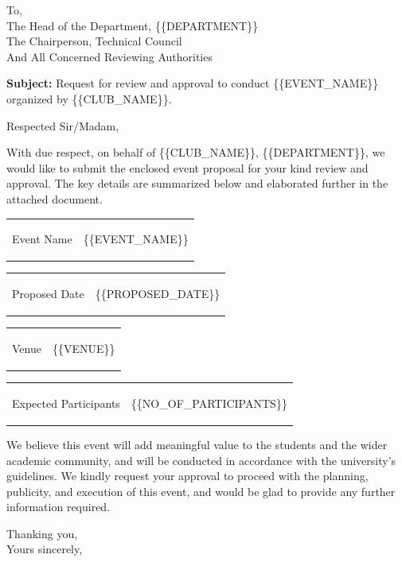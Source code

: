 \documentclass[12pt,a4paper]{article}
\newcommand{\PH}[1]{{\ttfamily\small\{\{#1\}\}}}
\newcommand{\ClubName}{\PH{CLUB\_NAME}}
\newcommand{\DepartmentName}{\PH{DEPARTMENT}}
\newcommand{\PreparedDate}{\PH{DATE}}
\newcommand{\EventName}{\PH{EVENT\_NAME}}
\newcommand{\ProposedDate}{\PH{PROPOSED\_DATE}}
\newcommand{\Venue}{\PH{VENUE}}
\newcommand{\ExpectedParticipants}{\PH{NO\_OF\_PARTICIPANTS}}
\newcommand{\SectionBox}[1]{%
\begin{tcolorbox}[colback=JainFill,colframe=JainBlue,boxrule=0.8pt,arc=1mm,left=6pt,right=6pt,top=5pt,bottom=5pt]
#1
\end{tcolorbox}
}
\newcommand{\InfoRow}[2]{%
\begin{tabularx}{\textwidth}{>{\bfseries\raggedright\arraybackslash}p{0.30\textwidth}X}
#1 & #2
\end{tabularx}\par
}
\begin{document}
\newpage


\vspace*{0.2cm}
\noindent \PreparedDate \hfill

\vspace{0.3cm}

\noindent
To,\\[3pt]
The Head of the Department, \DepartmentName\\
The Chairperson, Technical Council\\
And All Concerned Reviewing Authorities

\vspace{0.3cm}

\noindent \textbf{Subject: } Request for review and approval to conduct \EventName{} organized by \ClubName.

\vspace{0.3cm}

\noindent Respected Sir/Madam,

\vspace{0.25cm}

\noindent
With due respect, on behalf of \ClubName, \DepartmentName, we would like to submit the enclosed event proposal for your kind review and approval. The key details are summarized below and elaborated further in the attached document.

\vspace{0.3cm}

\SectionBox{
\InfoRow{Event Name}{\EventName}
\InfoRow{Proposed Date}{\ProposedDate}
\InfoRow{Venue}{\Venue}
\InfoRow{Expected Participants}{\ExpectedParticipants}
}

\vspace{0.3cm}

\noindent
We believe this event will add meaningful value to the students and the wider academic community, and will be conducted in accordance with the university's guidelines. We kindly request your approval to proceed with the planning, publicity, and execution of this event, and would be glad to provide any further information required.

\vspace{0.4cm}

\noindent Thanking you,\\
\noindent Yours sincerely,

\vspace{1.4cm}
\end{document}
